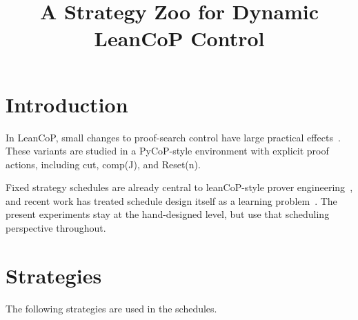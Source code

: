 \documentclass[11pt,twocolumn]{article}
\title{A Strategy Zoo for Dynamic LeanCoP Control}
\date{}
\author{}
\newcommand{\atom}[1]{\colorbox{Gray!30}{\ttfamily #1}}
\newcommand{\citen}[1]{~\parencite{#1}}
\begin{document}
\twocolumn[
	\centering
	\vspace{1em}
	{\LARGE Modifying LeanCoP Options on the Fly \par} \vspace{3pt}
	{\large (aka ``the PAAR/AITP paper'') \par}
	\vspace{2em}
]

\section{Introduction}

In LeanCoP, small changes to proof-search control have large practical effects\citen{ottenLeanCoP20,Otten2023leanCoP20}.
These variants are studied in a PyCoP-style environment with explicit proof actions, including \atom{cut}, \atom{comp(J)}, and \atom{Reset(n)}.

Fixed strategy schedules are already central to leanCoP-style prover engineering\citen{ottenLeanCoP20}, and recent work has treated schedule design itself as a learning problem\citen{mangla2022a,Mangla2025MLTPS}. The present experiments stay at the hand-designed level, but use that scheduling perspective throughout.

\section{Strategies}

The following strategies are used in the schedules.
\end{document}
